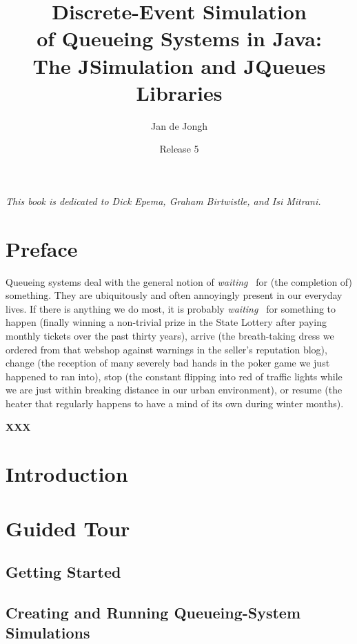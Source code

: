 \documentclass[12pt]{book}
\title{Discrete-Event Simulation\\
       of Queueing Systems in Java:\\
       The JSimulation and JQueues Libraries}
\author{Jan de Jongh}
\date{Release 5}
\begin{document}
\maketitle

\chapter*{}

{\em This book is dedicated to Dick Epema, Graham Birtwistle, and Isi Mitrani.}

\tableofcontents

\chapter{Preface}

Queueing systems deal with the general notion of {\em waiting\ }
  for (the completion of) something.
They are ubiquitously and often annoyingly present in our everyday lives.
If there is anything we do most,
  it is probably {\em waiting\ } for something to
  happen (finally winning a non-trivial prize in the State Lottery
          after paying monthly tickets over the past thirty years),
  arrive (the breath-taking dress we ordered from that webshop
          against warnings in the seller's reputation blog),
  change (the reception of many severely bad hands in the poker game
          we just happened to ran into),
  stop (the constant flipping into red of traffic lights
        while we are just within breaking distance
        in our urban environment),
  or resume (the heater that regularly happens to have
             a mind of its own during
             winter months).

{\bf XXX}

\chapter{Introduction}

\chapter{Guided Tour}

\section{Getting Started}

\section{Creating and Running Queueing-System Simulations}
\end{document}
